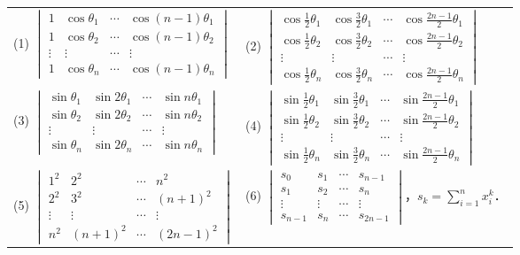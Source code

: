 \documentclass[a4paper,fontset=windows]{ctexbook}
\theoremstyle{definition}
\begin{document}
\begin{enumerate}
\hspace*{-6pt}\begin{tabular}{l@{\qquad\qquad}l}
(1) $\begin{vmatrix}1&\cos\theta_1&\cdots&\cos(n-1)\theta_1 \\ 1&\cos\theta_2&\cdots&\cos(n-1)\theta_2 \\ \vdots&\vdots&\cdots&\vdots \\ 1&\cos\theta_n&\cdots&\cos(n-1)\theta_n\end{vmatrix}$ &
(2) $\begin{vmatrix}\cos\frac{1}{2}\theta_1&\cos\frac{3}{2}\theta_1&\cdots&\cos\frac{2n-1}{2}\theta_1 \\ \cos\frac{1}{2}\theta_2&\cos\frac{3}{2}\theta_2&\cdots&\cos\frac{2n-1}{2}\theta_2 \\ \vdots&\vdots&\cdots&\vdots \\ \cos\frac{1}{2}\theta_n&\cos\frac{3}{2}\theta_n&\cdots&\cos\frac{2n-1}{2}\theta_n \end{vmatrix}$ \\
(3) $\begin{vmatrix}\sin\theta_1&\sin2\theta_1&\cdots&\sin n\theta_1 \\ \sin\theta_2&\sin2\theta_2&\cdots&\sin n\theta_2 \\ \vdots&\vdots&\cdots&\vdots \\ \sin\theta_n&\sin2\theta_n&\cdots&\sin n\theta_n\end{vmatrix}$ &
(4) $\begin{vmatrix}\sin\frac{1}{2}\theta_1&\sin\frac{3}{2}\theta_1&\cdots&\sin\frac{2n-1}{2}\theta_1 \\ \sin\frac{1}{2}\theta_2&\sin\frac{3}{2}\theta_2&\cdots&\sin\frac{2n-1}{2}\theta_2 \\ \vdots&\vdots&\cdots&\vdots \\ \sin\frac{1}{2}\theta_n&\sin\frac{3}{2}\theta_n&\cdots&\sin\frac{2n-1}{2}\theta_n\end{vmatrix}$ \\
(5) $\begin{vmatrix}1^2&2^2&\cdots&n^2 \\ 2^2&3^2&\cdots&(n+1)^2 \\ \vdots&\vdots&\cdots&\vdots \\ n^2&(n+1)^2&\cdots&(2n-1)^2\end{vmatrix}$ &
(6) $\begin{vmatrix}s_0&s_1&\cdots&s_{n-1} \\ s_1&s_2&\cdots&s_n \\ \vdots&\vdots&\cdots&\vdots \\ s_{n-1}&s_n&\cdots&s_{2n-1}\end{vmatrix}$，$s_k=\sum\limits_{i=1}^nx_i^k$． \\

\end{tabular}
\end{enumerate}
\end{document}
